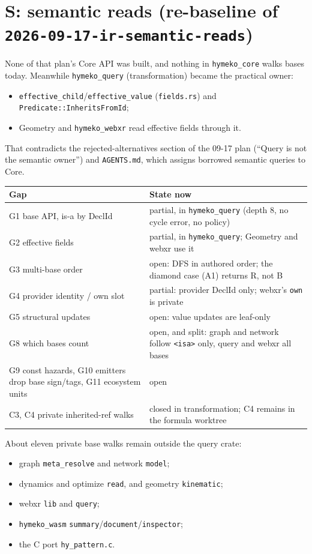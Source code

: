\documentclass[11pt,a4paper]{article}
\newcommand{\code}[1]{\texttt{#1}}
\begin{document}
\section{S: semantic reads (re-baseline of \code{2026-09-17-ir-semantic-reads})}
None of that plan's Core API was built, and nothing in \code{hymeko\_core} walks bases today. Meanwhile
\code{hymeko\_query} (transformation) became the practical owner:
\begin{itemize}[nosep]
\item \code{effective\_child}/\code{effective\_value} (\code{fields.rs}) and \code{Predicate::InheritsFromId};
\item Geometry and \code{hymeko\_webxr} read effective fields through it.
\end{itemize}
That contradicts the rejected-alternatives section of the 09-17 plan (``Query is not the semantic owner'')
and \code{AGENTS.md}, which assigns borrowed semantic queries to Core.

\begin{center}\small
\begin{tabularx}{\linewidth}{@{}lX@{}}
\toprule
Gap & State now \\
\midrule
G1 base API, is-a by DeclId & partial, in \code{hymeko\_query} (depth 8, no cycle error, no policy) \\
G2 effective fields & partial, in \code{hymeko\_query}; Geometry and webxr use it \\
G3 multi-base order & open: DFS in authored order; the diamond case (A1) returns R, not B \\
G4 provider identity / own slot & partial: provider DeclId only; webxr's \code{own} is private \\
G5 structural updates & open: value updates are leaf-only \\
G8 which bases count & open, and split: graph and network follow \code{<isa>} only, query and webxr all bases \\
G9 const hazards, G10 emitters drop base sign/tags, G11 ecosystem units & open \\
C3, C4 private inherited-ref walks & closed in transformation; C4 remains in the formula worktree \\
\bottomrule
\end{tabularx}
\end{center}

About eleven private base walks remain outside the query crate:
\begin{itemize}[nosep]
\item graph \code{meta\_resolve} and network \code{model};
\item dynamics and optimize \code{read}, and geometry \code{kinematic};
\item webxr \code{lib} and \code{query};
\item \code{hymeko\_wasm} \code{summary}/\code{document}/\code{inspector};
\item the C port \code{hy\_pattern.c}.
\end{itemize}
\end{document}

